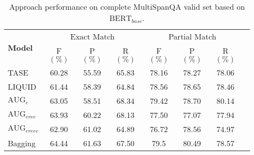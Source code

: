 \begin{table*}[width=\textwidth,cols=9,pos=h]  %
	\caption{Approach performance on complete MultiSpanQA valid set based on $\text{BERT}_{base}$.} 
	\label{tab:bertall}
	\begin{tabular*}{\textwidth}{@{\extracolsep{\fill}}lccccccc}
		\toprule
		\multirow{2}{*}{\textbf{Model}} & \multicolumn{3}{c}{Exact Match} & \multicolumn{3}{c}{Partial Match}  \\
		\cline{2-7} 
		\addlinespace
		& F\((\%)\) & P\((\%)\) & R\((\%)\) & F\((\%)\) & P\((\%)\) & R\((\%)\) \\
		\midrule
		TASE   & 60.28 & 55.59 & 65.83 & 78.16 & 78.27 & 78.06 \\ 
		LIQUID & 61.44 & 58.39 & 64.84 & 78.56 & 78.65 & 78.46 \\
		$\text{AUG}_{c}$ & 63.05 & 58.51 & 68.34 & 79.42 & 78.70 & 80.14 \\
		$\text{AUG}_{eree}$  & 63.93 & 60.22 & 68.13 & 77.50 & 77.07 & 77.94 \\
		$\text{AUG}_{ereec}$ & 62.90  & 61.02 & 64.89 & 76.72 & 78.56 & 74.97 \\
		Bagging & 64.44 & 61.63 & 67.50 & 79.5 & 80.49 & 78.57 \\
		\bottomrule
	\end{tabular*}
\end{table*}

